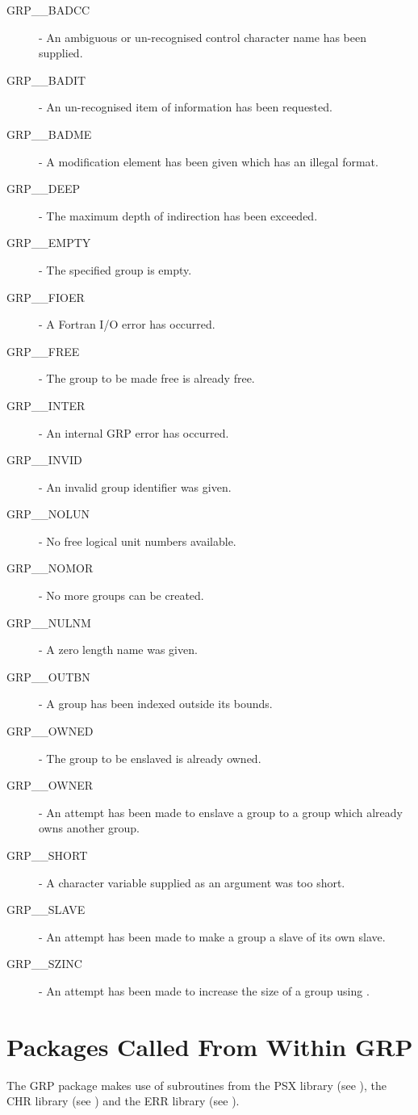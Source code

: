 \begin{description}
\item [GRP\_\_BADCC] - An ambiguous or un-recognised control character name has
been supplied.
\item [GRP\_\_BADIT] - An un-recognised item of information has been requested.
\item [GRP\_\_BADME] - A modification element has been given which has an
illegal format.
\item [GRP\_\_DEEP] - The maximum depth of indirection has been exceeded.
\item [GRP\_\_EMPTY] - The specified group is empty.
\item [GRP\_\_FIOER] - A Fortran I/O error has occurred.
\item [GRP\_\_FREE] - The group to be made free is already free.
\item [GRP\_\_INTER] - An internal GRP error has occurred.
\item [GRP\_\_INVID] - An invalid group identifier was given.
\item [GRP\_\_NOLUN] - No free logical unit numbers available.
\item [GRP\_\_NOMOR] - No more groups can be created.
\item [GRP\_\_NULNM] - A zero length name was given.
\item [GRP\_\_OUTBN] - A group has been indexed outside its bounds.
\item [GRP\_\_OWNED] - The group to be enslaved is already owned.
\item [GRP\_\_OWNER] - An attempt has been made to enslave a group to a group
which already owns another group.
\item [GRP\_\_SHORT] - A character variable supplied as an argument was too
short.
\item [GRP\_\_SLAVE] - An attempt has been made to make a group a slave of its
own slave.
\item [GRP\_\_SZINC] - An attempt has been made to increase the size of a
group using .
\end{description}

\section{\label{APP:PACK}Packages Called From Within GRP}
The GRP package makes use of subroutines from the PSX
library (see ), the CHR library (see
) and the ERR library (see
).

